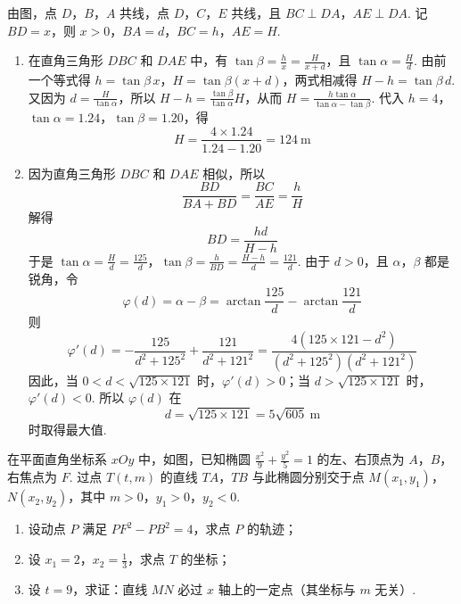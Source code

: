 \begin{solution}
由图，点 \(D\)，\(B\)，\(A\) 共线，点 \(D\)，\(C\)，\(E\) 共线，且 \(BC\perp DA\)，\(AE\perp DA\). 记 \(BD=x\)，则 \(x>0\)，\(BA=d\)，\(BC=h\)，\(AE=H\).

\begin{enumerate}
\item 在直角三角形 \(DBC\) 和 \(DAE\) 中，有 \(\tan\beta=\frac{h}{x}=\frac{H}{x+d}\)，且 \(\tan\alpha=\frac{H}{d}\).
由前一个等式得 \(h=\tan\beta\,x\)，\(H=\tan\beta(x+d)\)，两式相减得 \(H-h=\tan\beta\,d\). 又因为 \(d=\frac{H}{\tan\alpha}\)，所以
\(H-h=\frac{\tan\beta}{\tan\alpha}H\)，从而 \(H=\frac{h\tan\alpha}{\tan\alpha-\tan\beta}\).
代入 \(h=4\)，\(\tan\alpha=1.24\)，\(\tan\beta=1.20\)，得
\[
H=\frac{4\times1.24}{1.24-1.20}=124\ \mathrm{m}
\]

\item 因为直角三角形 \(DBC\) 和 \(DAE\) 相似，所以
\[
\frac{BD}{BA+BD}=\frac{BC}{AE}=\frac{h}{H}
\]
解得
\[
BD=\frac{hd}{H-h}
\]
于是 \(\tan\alpha=\frac{H}{d}=\frac{125}{d}\)，\(\tan\beta=\frac{h}{BD}=\frac{H-h}{d}=\frac{121}{d}\).
由于 \(d>0\)，且 \(\alpha\)，\(\beta\) 都是锐角，令
\[
\varphi(d)=\alpha-\beta=\arctan\frac{125}{d}-\arctan\frac{121}{d}
\]
则
\[
\varphi'(d)=-\frac{125}{d^2+125^2}+\frac{121}{d^2+121^2}
=\frac{4(125\times121-d^2)}{(d^2+125^2)(d^2+121^2)}
\]
因此，当 \(0<d<\sqrt{125\times121}\) 时，\(\varphi'(d)>0\)；当 \(d>\sqrt{125\times121}\) 时，\(\varphi'(d)<0\). 所以 \(\varphi(d)\) 在
\[
d=\sqrt{125\times121}=5\sqrt{605}\ \mathrm{m}
\]
时取得最大值.
\end{enumerate}
\end{solution}

\begin{problem}
在平面直角坐标系 \(xOy\) 中，如图，已知椭圆 \(\frac{x^2}{9}+\frac{y^2}{5}=1\) 的左、右顶点为 \(A\)，\(B\)，右焦点为 \(F\). 过点 \(T(t,m)\) 的直线 \(TA\)，\(TB\) 与此椭圆分别交于点 \(M(x_1,y_1)\)，\(N(x_2,y_2)\)，其中 \(m>0\)，\(y_1>0\)，\(y_2<0\).

\begin{enumerate}
\item 设动点 \(P\) 满足 \(PF^2-PB^2=4\)，求点 \(P\) 的轨迹；
\item 设 \(x_1=2\)，\(x_2=\frac{1}{3}\)，求点 \(T\) 的坐标；
\item 设 \(t=9\)，求证：直线 \(MN\) 必过 \(x\) 轴上的一定点（其坐标与 \(m\) 无关）.
\end{enumerate}

\end{problem}

